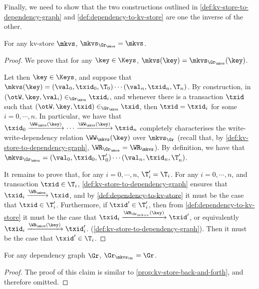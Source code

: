 Finally, we need to show that the two constructions outlined in \cref{def:kv-store-to-dependency-graph} and 
\cref{def:dependency-to-kv-store} are one the inverse of the other.

\begin{proposition}
\label{prop:kv-store-back-and-forth}
For any kv-store $\mkvs$, $\mkvs_{\Gr_{\mkvs}} = \mkvs$.
\end{proposition}

\begin{proof}
We prove that for any $\key \in \Keys$, 
$\mkvs(\key) = \mkvs_{\Gr_{\mkvs}}(\key)$.

Let then $\key \in \Keys$, and suppose that $\mkvs(\key) = (\val_{0}, \txid_{0}, \T_{0}) \cdots (\val_{n}, \txid_{n}, \T_{n})$. 
By construction, in $(\otW, \key, \val_{i}) \in_{\Gr_{\mkvs}} \txid_{i}$, and whenever there is a transaction 
$\txid$ such that $(\otW, \key, \txid) \in_{\Gr_{\mkvs}} \txid$, then $\txid = \txid_{i}$ for some $i=0,\cdots, n$. 
In particular, we have that $\txid_{0} \xrightarrow{\WW_{\mkvs}(\key)} \cdots \xrightarrow{\WW_{\mkvs}(\key)} \txid_{n}$ 
completely characterises the write-write-dependency relation $\WW_{\mkvs}(\key)$ over $\mkvs_{\Gr}$ 
 (recall that, by \cref{def:kv-store-to-dependency-graph}, $\WR_{\Gr_{\mkvs}} = \WR_{\mkvs}$).
By definition, we have that $\mkvs_{\Gr_{\mkvs}} = (\val_{0}, \txid_{0}, \T'_{0}) \cdots (\val_{n}, \txid_{n}, \T'_{n})$. 

It remains to prove that, for any $i=0,\cdots, n$, $\T'_{i} = \T_{i}$.
For any $i=0,\cdots, n$, and transaction $\txid \in \T_{i}$, \cref{def:kv-store-to-dependency-graph} ensures that 
$\txid_{i} \xrightarrow{\WR_{\mkvs}} \txid$, 
and by \cref{def:dependency-to-kv-store} it must be the case that $\txid \in \T'_{i}$.
Furthermore, if $\txid' \in \T'_{i}$, then from \cref{def:dependency-to-kv-store} it must be 
the case that $\txid_{i} \xrightarrow{\WR_{\Gr_{mkvs}}(\key)} \txid'$, 
or equivalently $\txid_{i} \xrightarrow{\WR_{\mkvs}(\key)} \txid'_{i}$.
(\cref{def:kv-store-to-dependency-graph}). Then it must be the case that $\txid' \in \T_{i}$. 
\end{proof}

\begin{proposition}
\label{prop:dependency-back-and-forth}
For any dependency graph $\Gr$, $\Gr_{\mkvs_{\Gr}} = \Gr$. 
\end{proposition}

\begin{proof}
The proof of this claim is similar to \cref{prop:kv-store-back-and-forth}, and therefore omitted.
\end{proof}


